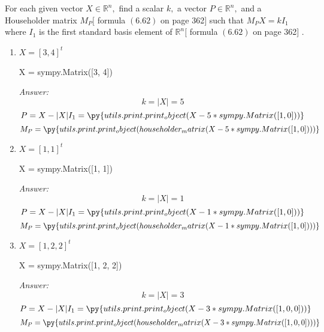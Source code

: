 \documentclass[letterpaper]{article}
\newcommand{\ans}{\textit{Answer: }}
\newenvironment{question}[2][Question]{\begin{trivlist}
\item[\hskip \labelsep {\bfseries #1}\hskip \labelsep {\bfseries #2.}]}{\end{trivlist}}
\newcommand{\printobj}[1]{\py{utils.print.print_object(#1)}}
\begin{document}
\begin{question}{6.84}
  For each given vector $X \in \mathbb{R}^{n},$ find a scalar $k,$ a vector $P \in \mathbb{R}^{n},$ and a 
  Householder matrix $M_{P}[$ formula $(6.62)$ on page 362$]$ such that $M_{P} X=k I_{1}$ where $I_{1}$
  is the first standard basis element of $\mathbb{R}^{n}[$ formula $(6.62)$ on page 362$]$ .

  \begin{enumerate}
    \item $X=[3,4]^{t}$
    \begin{pycode}
X = sympy.Matrix([3, 4])
    \end{pycode}

    \ans 
    $$k = |X| = 5$$
    $$P = X - |X|I_1 = \printobj{X - 5 * sympy.Matrix([1, 0])}$$
    $$M_P = \printobj{householder_matrix(X - 5 * sympy.Matrix([1, 0]))}$$

    \item $X=[1,1]^{t}$
    \begin{pycode}
X = sympy.Matrix([1, 1])
    \end{pycode}

    \ans 
    $$k = |X| = 1$$
    $$P = X - |X|I_1 = \printobj{X - 1 * sympy.Matrix([1, 0])}$$
    $$M_P = \printobj{householder_matrix(X - 1 * sympy.Matrix([1, 0]))}$$

    \item $X=[1,2,2]^{t}$
    \begin{pycode}
X = sympy.Matrix([1, 2, 2])
    \end{pycode}

    \ans 
    $$k = |X| = 3$$
    $$P = X - |X|I_1 = \printobj{X - 3 * sympy.Matrix([1, 0, 0])}$$
    $$M_P = \printobj{householder_matrix(X - 3 * sympy.Matrix([1, 0, 0]))}$$
  \end{enumerate}
\end{question}
\end{document}
